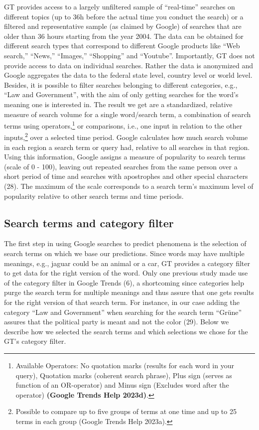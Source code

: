 \documentclass[
  letterpaper,
  DIV=11,
  numbers=noendperiod]{scrartcl}
\begin{document}
GT provides access to a largely unﬁltered sample of ``real-time''
searches on different topics (up to 36h before the actual time you
conduct the search) or a ﬁltered and representative sample (as claimed
by Google) of searches that are older than 36 hours starting from the
year 2004. The data can be obtained for different search types that
correspond to diﬀerent Google products like ``Web search,'' ``News,''
``Images,'' ``Shopping'' and ``Youtube''. Importantly, GT does not
provide access to data on individual searches. Rather the data is
anonymized and Google aggregates the data to the federal state level,
country level or world level. Besides, it is possible to filter searches
belonging to different categories, e.g., ``Law and Government'', with
the aim of only getting searches for the word's meaning one is
interested in. The result we get are a standardized, relative measure of
search volume for a single word/search term, a combination of search
terms using operators,\footnote{Available Operators: No quotation marks
  (results for each word in your query), Quotation marks (coherent
  search phrase), Plus sign (serves as function of an OR-operator) and
  Minus sign (Excludes word after the operator) \textbf{(Google Trends
  Help 2023d)}.} or comparisons, i.e., one input in relation to the
other inputs,\footnote{Possible to compare up to ﬁve groups of terms at
  one time and up to 25 terms in each group (Google Trends Help 2023a).}
over a selected time period. Google calculates how much search volume in
each region a search term or query had, relative to all searches in that
region. Using this information, Google assigns a measure of popularity
to search terms (scale of 0 - 100), leaving out repeated searches from
the same person over a short period of time and searches with
apostrophes and other special characters (28). The maximum of the scale
corresponds to a search term's maximum level of popularity relative to
other search terms and time periods.

\hypertarget{sec-searchterms}{%
\subsection{Search terms and category filter}\label{sec-searchterms}}

The first step in using Google searches to predict phenomena is the
selection of search terms on which we base our predictions. Since words
may have multiple meanings, e.g., jaguar could be an animal or a car, GT
provides a category filter to get data for the right version of the
word. Only one previous study made use of the category filter in Google
Trends (6), a shortcoming since categories help purge the search term
for multiple meanings and thus assure that one gets results for the
right version of that search term. For instance, in our case adding the
category ``Law and Government'' when searching for the search term
``Grüne'' assures that the political party is meant and not the color
(29). Below we describe how we selected the search terms and which
selections we chose for the GT's category filter.
\end{document}
